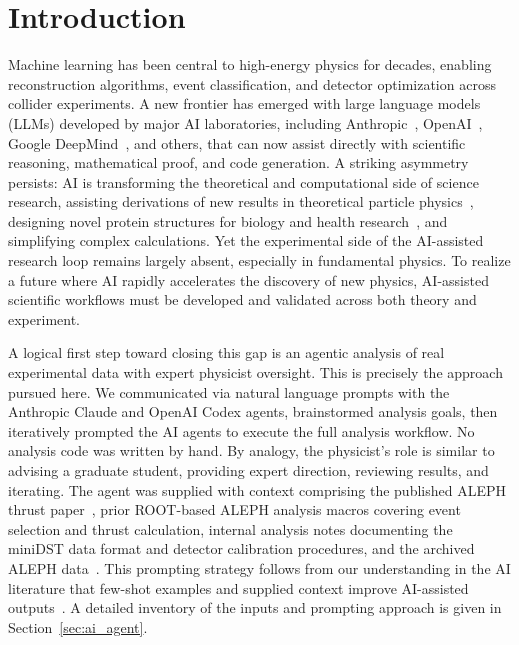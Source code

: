 \section{Introduction}
\label{sec:introduction}

Machine learning has been central to high-energy physics for decades, enabling
reconstruction algorithms, event classification, and detector optimization across
collider experiments. A new frontier has emerged with large language models (LLMs)
developed by major AI laboratories, including
Anthropic~\cite{Anthropic:2025accelerating}, OpenAI~\cite{OpenAI:2025gpt5science},
Google DeepMind~\cite{GoogleDeepMind:2025geminiscience}, and others, that can now
assist directly with scientific reasoning, mathematical proof, and code generation.
A striking asymmetry persists: AI is transforming the theoretical and computational side of science research, assisting derivations of new results in theoretical particle physics~\cite{OpenAI:2025newresult}, designing novel protein structures for biology and health research~\cite{GoogleDeepMind:2025alphaproteo}, and simplifying complex calculations. Yet the experimental side of the AI-assisted research loop remains largely absent, especially in fundamental physics. To realize a future where AI rapidly accelerates the discovery of new physics, AI-assisted scientific workflows must be developed and validated across both theory and experiment.

A logical first step toward closing this gap is an agentic analysis of real
experimental data with expert physicist oversight. This is precisely the approach
pursued here. We communicated via natural language prompts with the Anthropic Claude and OpenAI Codex agents, brainstormed
analysis goals, then iteratively prompted the AI agents to execute the full
analysis workflow. No analysis code was written by hand. By analogy, the physicist's role is
similar to advising a graduate student, providing expert direction, reviewing
results, and iterating. The agent was supplied with context comprising the published ALEPH thrust paper~\cite{Heister:2003aj}, prior ROOT-based ALEPH analysis macros covering event selection and thrust calculation, internal analysis notes documenting the miniDST data format and detector calibration procedures, and the archived ALEPH data~\cite{ALEPH:docs}. This prompting strategy follows from our understanding in the AI literature that few-shot examples and supplied context improve AI-assisted outputs~\cite{Brown:2020fewshot,Wei:2022cot}. A detailed inventory of the inputs and prompting approach is given in Section~\ref{sec:ai_agent}.

